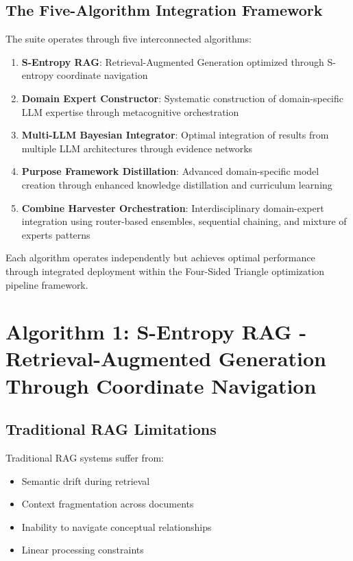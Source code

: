 \documentclass[12pt,a4paper]{article}
\begin{document}
\subsection{The Five-Algorithm Integration Framework}

The suite operates through five interconnected algorithms:

\begin{enumerate}
\item \textbf{S-Entropy RAG}: Retrieval-Augmented Generation optimized through S-entropy coordinate navigation
\item \textbf{Domain Expert Constructor}: Systematic construction of domain-specific LLM expertise through metacognitive orchestration
\item \textbf{Multi-LLM Bayesian Integrator}: Optimal integration of results from multiple LLM architectures through evidence networks
\item \textbf{Purpose Framework Distillation}: Advanced domain-specific model creation through enhanced knowledge distillation and curriculum learning
\item \textbf{Combine Harvester Orchestration}: Interdisciplinary domain-expert integration using router-based ensembles, sequential chaining, and mixture of experts patterns
\end{enumerate}

Each algorithm operates independently but achieves optimal performance through integrated deployment within the Four-Sided Triangle optimization pipeline framework.

\section{Algorithm 1: S-Entropy RAG - Retrieval-Augmented Generation Through Coordinate Navigation}

\subsection{Traditional RAG Limitations}

Traditional RAG systems suffer from:
\begin{itemize}
\item Semantic drift during retrieval
\item Context fragmentation across documents
\item Inability to navigate conceptual relationships
\item Linear processing constraints
\end{itemize}
\end{document}
